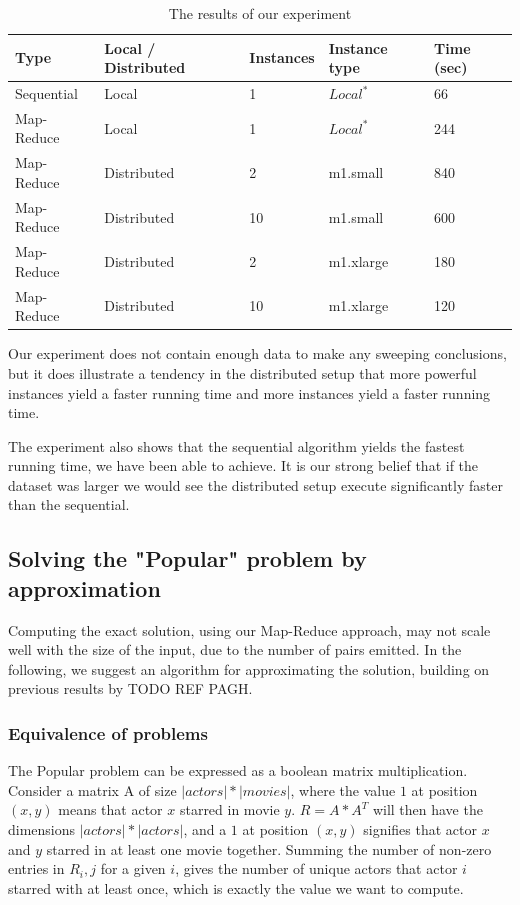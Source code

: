 \documentclass[a4paper,11pt]{article}
\begin{document}
\begin{table}[h!]
\label{tab:benchmark}
\begin{center}
    \begin{tabular}{|l|l|l|l|l|}
    \hline
    Type       & Local / Distributed & Instances & Instance type                     & Time (sec) \\ \hline
    Sequential & Local               & 1         & $Local^*$ & 66                 \\ \hline
    Map-Reduce & Local               & 1         & $Local^*$ & 244                 \\ \hline
    Map-Reduce & Distributed         & 2         & m1.small                          & 840                 \\ \hline
    Map-Reduce & Distributed         & 10        & m1.small                          & 600                 \\ \hline
    Map-Reduce & Distributed         & 2         & m1.xlarge                         & 180                 \\ \hline
    Map-Reduce & Distributed         & 10        & m1.xlarge                         & 120                 \\ \hline
    \end{tabular}
    \end{center}
    \caption{The results of our experiment}
\end{table}
Our experiment does not contain enough data to make any sweeping conclusions, but it does illustrate a tendency in the distributed setup that more powerful instances yield a faster running time and more instances yield a faster running time. 

The experiment also shows that the sequential algorithm yields the fastest running time, we have been able to achieve. 
It is our strong belief that if the dataset was larger we would see the distributed setup execute significantly faster than the sequential.

\subsection{Solving the "Popular" problem by approximation}
Computing the exact solution, using our Map-Reduce approach, may not scale well with the size of the input, due to the number of pairs emitted. In the following, we suggest an algorithm for approximating the solution, building on previous results by TODO REF PAGH.

\subsubsection{Equivalence of problems}
The Popular problem can be expressed as a boolean matrix multiplication. Consider a matrix A of size $|actors|*|movies|$, where the value $1$ at position $(x, y)$ means that actor $x$ starred in movie $y$. $R = A * A^T$ will then have the dimensions $|actors|*|actors|$, and a $1$ at position $(x, y)$ signifies that actor $x$ and $y$ starred in at least one movie together. Summing the number of non-zero entries in $R_i,j$ for a given $i$, gives the number of unique actors that actor $i$ starred with at least once, which is exactly the value we want to compute.
\end{document}
